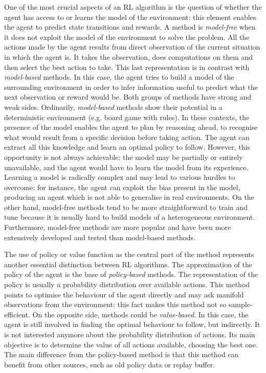 One of the most crucial aspects of an RL algorithm is the question of whether the agent has access to or learns the model of the environment: this element enables the agent to predict state transitions and rewards.
A method is \textit{model-free} when it does not exploit the model of the environment to solve the problem. All the actions made by the agent results from direct observation of the current situation in which the agent is. It takes the observation, does computations on them and then select the best action to take.
This last representation is in contrast with \textit{model-based} methods. In this case, the agent tries to build a model of the surrounding environment in order to infer information useful to predict what the next observation or reward would be.
Both groups of methods have strong and weak sides.
Ordinarily, \textit{model-based} methods show their potential in a deterministic environment (e.g. board game with rules). In these contexts, the presence of the model enables the agent to plan by reasoning ahead, to recognise what would result from a specific decision before taking action. The agent can extract all this knowledge and learn an optimal policy to follow. However, this opportunity is not always achievable: the model may be partially or entirely unavailable, and the agent would have to learn the model from its experience. Learning a model is radically complex and may lead to various hurdles to overcome: for instance, the agent can exploit the bias present in the model, producing an agent which is not able to generalise in real environments.
On the other hand, model-free methods tend to be more straightforward to train and tune because it is usually hard to build models of a heterogeneous environment. Furthermore, model-free methods are more popular and have been more extensively developed and tested than model-based methods.

The use of policy or value function as the central part of the method represents another essential distinction between RL algorithms.
The approximation of the policy of the agent is the base of \textit{policy-based} methods. The representation of the policy is usually a probability distribution over available actions. This method points to optimise the behaviour of the agent directly and may ask manifold observations from the environment: this fact makes this method not so sample-efficient.
On the opposite side, methods could be \textit{value-based}. In this case, the agent is still involved in finding the optimal behaviour to follow, but indirectly. It is not interested anymore about the probability distribution of actions. Its main objective is to determine the value of all actions available, choosing the best one. The main difference from the policy-based method is that this method can benefit from other sources, such as old policy data or replay buffer.

